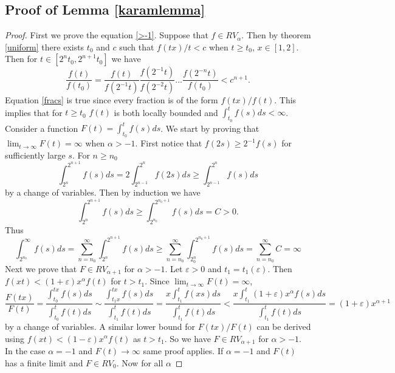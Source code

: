 \documentclass[english,12pt,a4paper,pdftex,sci,utf8]{aaltothesis} %
\begin{document}
\subsection{Proof of Lemma \ref{karamlemma}}

\begin{proof}
First we prove the equation \eqref{>-1}. Suppose that $f \in RV_{\alpha}$. Then by theorem \ref{uniform} there exists $t_0$ and $c$ such that $f(tx)/t<c$ when $t \geq t_0$, $x \in [1,2]$. Then for $t \in [2^nt_0, 2^{n+1}t_0]$ we have
\begin{equation}
\frac{f(t)}{f(t_0)}=\frac{f(t)}{f(2^{-1}t)}\frac{f(2^{-1}t)}{f(2^{-2}t)} ... \frac{f(2^{-n}t)}{f(t_0)} < c^{n+1}.
\label{fracs}
\end{equation}
Equation \eqref{fracs} is true since every fraction is of the form $f(tx)/f(t)$. This implies that for $t\geq t_0$ $f(t)$ is both locally bounded and $\int_{t_0}^{t}f(s)ds<\infty$. Consider a function $F(t) = \int_{t_0}^{t}f(s)ds$. We start by proving that $\lim_{t \rightarrow \infty} F(t) = \infty$ when $\alpha>-1$. First notice that $f(2s) \geq 2^{-1}f(s)$ for sufficiently large $s$. For $n\geq n_0$
\begin{equation}
\int_{2^n}^{2^{n+1}} f(s)ds = 2\int_{2^{n-1}}^{2^{n}} f(2s)ds \geq \int_{2^{n-1}}^{2^n} f(s)ds
\label{varchange}
\end{equation}
by a change of variables. Then by induction we have
\begin{equation}
\int_{2^n}^{2^{n+1}} f(s)ds \geq \int_{2^{n_0}}^{2^{n_0+1}} f(s)ds = C > 0.
\label{induction}
\end{equation}
Thus
\begin{equation}
\int_{2^{n_0}}^{\infty} f(s)ds = \sum_{n=n_0}^{\infty} \int_{2^n}^{2^{n+1}} f(s)ds \geq \sum_{n=n_0}^{\infty} \int_{2^n_0}^{2^{n_0+1}} f(s)ds = \sum_{n=n_0}^{\infty} C = \infty
\label{infinite}
\end{equation}
Next we prove that $F \in RV_{\alpha+1}$ for $\alpha>-1$. Let $\varepsilon>0$ and $t_1=t_1(\varepsilon)$. Then $f(xt)<(1+\varepsilon)x^{\alpha}f(t)$ for $t>t_1$. Since $\lim_{t \rightarrow \infty} F(t)=\infty$,
\begin{equation*}
\frac{F(tx)}{F(t)} = \frac{\int_{t_0}^{tx} f(s)ds}{\int_{t_0}^{t} f(t)ds} \sim \frac{\int_{t_1x}^{tx} f(s)ds}{\int_{t_1}^{t} f(t)ds}=\frac{x\int_{t_1}^{t} f(xs)ds}{\int_{t_1}^{t} f(t)ds} < \frac{x\int_{t_1}^{t}(1+\varepsilon)x^{\alpha} f(s)ds}{\int_{t_1}^{t} f(t)ds} = (1+ \varepsilon)x^{\alpha+1}
\end{equation*}
by a change of variables. A similar lower bound for $F(tx)/F(t)$ can be derived using $f(xt)<(1-\varepsilon)x^{\alpha}f(t)$ as $t > t_1$. So we have $F \in RV_{\alpha+1}$ for $\alpha>-1$. In the case $\alpha=-1$ and $F(t) \rightarrow \infty$ same proof applies. If $\alpha=-1$ and $F(t)$ has a finite limit and $F \in RV_0$. Now for all $\alpha$

\end{proof}
\end{document}
